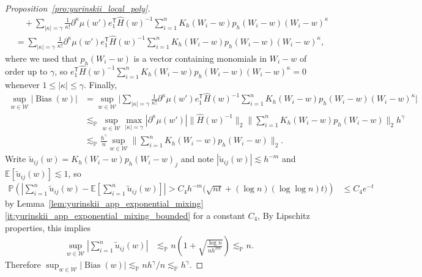 \documentclass[11pt,lof]{puthesis}
\renewcommand{\P}{\ensuremath{\mathbb{P}}}
\newcommand{\E}{\ensuremath{\mathbb{E}}}
\newcommand{\cW}{\ensuremath{\mathcal{W}}}
\newcommand{\T}{\ensuremath{\mathsf{T}}}
\DeclareMathOperator{\Bias}{Bias}
\theoremstyle{break}
\theoremstyle{proof}
\newtheorem{proof}{Proof}
\begin{document}
\begin{proof}[Proposition~\ref{pro:yurinskii_local_poly}]
\begin{align*}
    &\quad+
    \sum_{|\kappa|=\gamma}
    \frac{1}{\kappa!}
    \partial^{\kappa} \mu(w')
    e_1^\T \hat H(w)^{-1}
    \sum_{i=1}^n K_h(W_i-w) p_h(W_i-w)
    (W_i-w)^\kappa \\
    &=
    \sum_{|\kappa|=\gamma}
    \frac{1}{\kappa!}
    \partial^{\kappa} \mu(w')
    e_1^\T \hat H(w)^{-1}
    \sum_{i=1}^n K_h(W_i-w) p_h(W_i-w)
    (W_i-w)^\kappa,
  \end{align*}
  where we used that
  $p_h(W_i-w)$ is a vector containing monomials
  in $W_i-w$ of order up to $\gamma$, so
  $e_1^\T \hat H(w)^{-1}
  \sum_{i=1}^n K_h(W_i-w) p_h(W_i-w)
  (W_i-w)^\kappa = 0$
  whenever $1 \leq |\kappa| \leq \gamma$.
  Finally,
  \begin{align*}
    \sup_{w\in\cW}
    |\Bias(w)|
    &=
    \sup_{w\in\cW}
    \Bigg|
    \sum_{|\kappa|=\gamma}
    \frac{1}{\kappa!}
    \partial^{\kappa} \mu(w')
    e_1^\T \hat H(w)^{-1}
    \sum_{i=1}^n K_h(W_i-w) p_h(W_i-w)
    (W_i-w)^\kappa
    \Bigg| \\
    &\lesssim_\P
    \sup_{w\in\cW}
    \max_{|\kappa| = \gamma}
    \left|
      \partial^{\kappa} \mu(w')
    \right|
    \|\hat H(w)^{-1}\|_2
    \Bigg\|
    \sum_{i=1}^n K_h(W_i-w) p_h(W_i-w)
    \Bigg\|_2
    h^\gamma \\
    &\lesssim_\P
    \frac{h^\gamma}{n}
    \sup_{w\in\cW}
    \Bigg\|
    \sum_{i=1}^n K_h(W_i-w) p_h(W_i-w)
    \Bigg\|_2.
  \end{align*}
  Write
  $\tilde u_{i j}(w) = K_h(W_i-w)p_h(W_i-w)_j$
  and note $|\tilde u_{i j}(w)| \lesssim h^{-m}$
  and $\E[\tilde u_{i j}(w)] \lesssim 1$, so
  \begin{align*}
    \P\left(
      \left|
        \sum_{i=1}^n \tilde u_{i j}(w)
        - \E\left[
          \sum_{i=1}^n \tilde u_{i j}(w)
        \right]
      \right|
      > C_4 h^{-m} \big( \sqrt{n t}
      + (\log n)(\log \log n) t \big)
    \right)
    &\leq
    C_4 e^{-t}
  \end{align*}
  by Lemma~\ref{lem:yurinskii_app_exponential_mixing}%
  \ref{it:yurinskii_app_exponential_mixing_bounded} for a constant $C_4$,
  By Lipschitz properties, this implies
  \begin{align*}
    \sup_{w \in \cW}
    \left|
      \sum_{i=1}^n \tilde u_{i j}(w)
    \right|
    &\lesssim_\P
    n
    \left(
      1 + \sqrt{\frac{\log n}{n h^{2m}}}
    \right)
    \lesssim_\P
    n.
  \end{align*}
  Therefore
  $\sup_{w\in\cW} |\Bias(w)|
  \lesssim_\P n h^\gamma / n
  \lesssim_\P h^\gamma$.


\end{proof}
\end{document}
